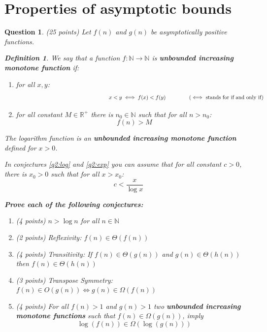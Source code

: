 \documentclass[a4paper]{article}
\theoremstyle{remarksStyle}
\newtheorem*{definition}{Definition}
\theoremstyle{questionStyle}
\newtheorem{question}{Question}
\theoremstyle{answerStyle}
\begin{document}
\newpage

\section {Properties of asymptotic bounds}
\begin{question} (25 points) \label{q2}
Let $f(n)$ and $g(n)$ be asymptotically positive functions.

\begin{definition}
    We say that a function $f: \mathbb{N} \to \mathbb{N}$ is \textbf{unbounded increasing monotone function} if:
    \begin{enumerate}
        \item for all $x,y$:
        \[\text{\hspace{6cm}}x < y \iff f(x) < f(y) \text{\hspace{1.4cm} ($\iff$ stands for if and only if)}\]

        
        \item for all constant $M\in \mathbb{R}^+$ there is $n_0 \in \mathbb{N}$ such that for all $n > n_0$:
        \[f(n) > M\]
    \end{enumerate}
\end{definition}

\begin{boxxed}
    \textcolor{CB_blue}{
    The logarithm function is an \textbf{unbounded increasing monotone function} defined for $x > 0$.}
\end{boxxed}

\begin{boxxed}
    \textcolor{CB_blue}{
    In conjectures \ref{q2:log} and \ref{q2:exp} you can assume that for all constant $c > 0$, there is $x_0 > 0$ such that for all $x > x_0$: \[c < \frac{x}{\log x}\]}
\end{boxxed}

\vspace{1ex}
\textbf{Prove each of the following conjectures:}

\begin{enumerate}
    \item (4 points) $n > \log n $ for all $n \in \mathbb{N}$
    \item (2 points) Reflexivity: $f(n) \in \Theta(f(n))$
    \item (4 points) Transitivity: If $f(n) \in \Theta(g(n))$ and $g(n) \in \Theta(h(n))$ then $f(n) \in \Theta(h(n))$
    \item (3 points) Transpose Symmetry: $f(n) \in O(g(n)) \iff g(n) \in \Omega(f(n))$
    \item (4 points) For all $f(n) > 1$ and $g(n) > 1$ two \textbf{\textcolor{Bittersweet}{unbounded increasing monotone functions}} such that $f(n) \in \Omega(g(n))$, imply \[\log (f(n)) \in \Omega(\log (g(n)))\]


\end{enumerate}
\end{question}
\end{document}
